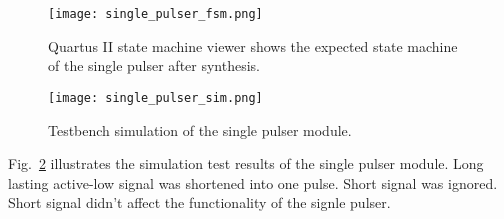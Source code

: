 \begin{figure}[htbp]
   \centering
   \texttt{[image: single\_pulser\_fsm.png]}
   \caption{Quartus II state machine viewer shows the expected state machine of the single pulser after synthesis.}
   \label{fig:single_pulser_fsm}
\end{figure}

\begin{figure}[htbp]
   \centering
   \texttt{[image: single\_pulser\_sim.png]}
   \caption{Testbench simulation of the single pulser module.}
   \label{fig:single_pulser_sim}
\end{figure}

Fig.~\ref{fig:single_pulser_sim} illustrates the simulation test results of the single pulser module. Long lasting active-low signal was shortened into one pulse. Short signal was ignored. Short signal didn't affect the functionality of the signle pulser.
